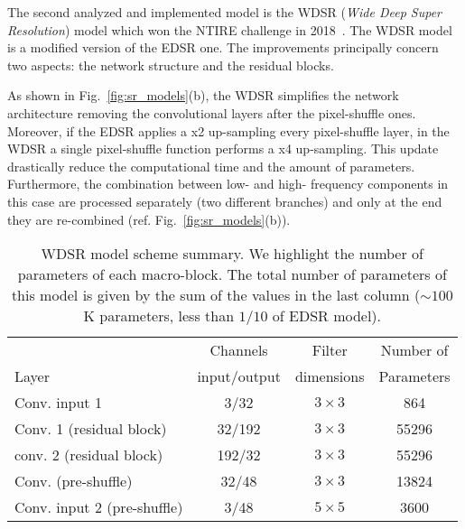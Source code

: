 \documentclass{standalone}
\begin{document}
The second analyzed and implemented model is the WDSR (\emph{Wide Deep Super Resolution}) model which won the NTIRE challenge in 2018~\cite{wdsr}.
The WDSR model is a modified version of the EDSR one.
The improvements principally concern two aspects: the network structure and the residual blocks.

As shown in Fig.~\ref{fig:sr_models}(b), the WDSR simplifies the network architecture removing the convolutional layers after the pixel-shuffle ones.
Moreover, if the EDSR applies a x2 up-sampling every pixel-shuffle layer, in the WDSR a single pixel-shuffle function performs a x4 up-sampling.
This update drastically reduce the computational time and the amount of parameters.
Furthermore, the combination between low- and high- frequency components in this case are processed separately (two different branches) and only at the end they are re-combined (ref. Fig.~\ref{fig:sr_models}(b)).

\begin{table}[htbp]
\centering
\begin{tabular}{lccc}
\hline \rowcolor{darkgrayrow}
                            &  Channels     & Filter     & Number of    \\
\rowcolor{darkgrayrow}
Layer                       & input/output  & dimensions & Parameters   \\
\hline
Conv. input 1               & 3/32       & $3\times3$   & 864     \\
Conv. 1 (residual block)    & 32/192     & $3\times3$   & 55296   \\
conv. 2 (residual block)    & 192/32     & $3\times3$   & 55296   \\
Conv. (pre-shuffle)         & 32/48      & $3\times3$   & 13824   \\
Conv. input 2 (pre-shuffle) & 3/48       & $5\times5$   & 3600    \\
\hline
\end{tabular}
\caption{WDSR model scheme summary.
We highlight the number of parameters of each macro-block.
The total number of parameters of this model is given by the sum of the values in the last column ($\sim100$K parameters, less than $1/10$ of EDSR model).
}
\label{tab:wdsr}
\end{table}
\end{document}
